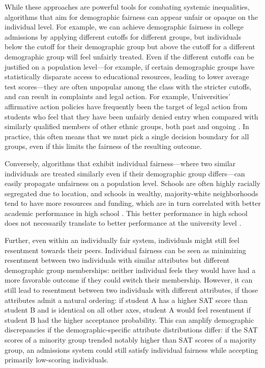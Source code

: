     While these approaches are powerful tools for combating systemic inequalities, algorithms that aim for demographic fairness can appear unfair or opaque on the individual level. For example, we can achieve demographic fairness in college admissions by applying different cutoffs for different groups, but individuals below the cutoff for their demographic group but above the cutoff for a different demographic group will feel unfairly treated. Even if the different cutoffs can be justified on a population level---for example, if certain demographic groups have statistically disparate access to educational resources, leading to lower average test scores---they are often unpopular among the class with the stricter cutoffs, and can result in complaints and legal action. For example, Universities' affirmative action policies have frequently been the target of legal action from students who feel that they have been unfairly denied entry when compared with similarly qualified members of other ethnic groups, both past \citep{2013fisher,2016fisher,1978Bakke} and ongoing \citep{2014SFFA}. In practice, this often means that we must pick a single decision boundary for all groups, even if this limits the fairness of the resulting outcome.
    
    Conversely, algorithms that exhibit individual fairness---where two similar individuals are treated similarly even if their demographic group differs---can easily propagate unfairness on a population level. Schools are often highly racially segregated due to location, and schools in wealthy, majority-white neighborhoods tend to have more resources and funding, which are in turn correlated with better academic performance in high school \citep{USCivilRights:2018,national2013nation}. This better performance in high school does not necessarily translate to better performance at the university level \citep{VidalRodeiro:Zanini:2015}.
    
    Further, even within an individually fair system, individuals might still feel resentment towards their peers. Individual fairness can be seen as minimizing resentment between two individuals with similar attributes but different demographic group memberships: neither individual feels they would have had a more favorable outcome if they could switch their membership. However, it can still lead to resentment between two individuals with different attributes, if those attributes admit a natural ordering: if student A has a higher SAT score than student B and is identical on all other axes, student A would feel resentment if student B had the higher acceptance probability. This can amplify demographic discrepancies if the demographic-specific attribute distributions differ: if the SAT scores of a minority group trended notably higher than SAT scores of a majority group, an admissions system could still satisfy individual fairness while accepting primarily low-scoring individuals.


